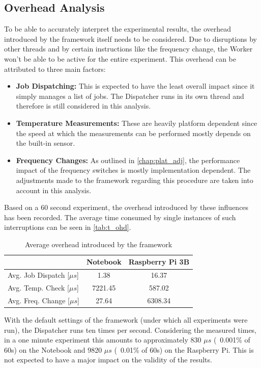 \subsection{Overhead Analysis}\label{chap:ohd_a}
To be able to accurately interpret the experimental results, the overhead introduced by the framework itself needs to be considered. Due to disruptions by other threads and by certain instructions like the frequency change, the Worker won't be able to be active for the entire experiment. This overhead can be attributed to three main factors:
\begin{itemize}
\item \textbf{Job Dispatching:} This is expected to have the least overall impact since it simply manages a list of jobs. The Dispatcher runs in its own thread and therefore is still considered in this analysis.
\item \textbf{Temperature Measurements:} These are heavily platform dependent since the speed at which the measurements can be performed mostly depends on the built-in sensor.
\item \textbf{Frequency Changes:} As outlined in \autoref{chap:plat_adj}, the performance impact of the frequency switches is mostly implementation dependent. The adjustments made to the framework regarding this procedure are taken into account in this analysis.
\end{itemize}
Based on a 60 second experiment, the overhead introduced by these influences has been recorded. The average time consumed by single instances of such interruptions can be seen in \autoref{tab:t_ohd}.\\
\begin{table}[H]
 \centering
 \caption[Overhead]{Average overhead introduced by the framework}\label{tab:t_ohd}
 \begin{tabular}{||l | c | c||} 
 \hline
  & Notebook & Raspberry Pi 3B \\ [0.5ex] 
 \hline\hline
 Avg. Job Dispatch [$\mu s$] & 1.38 & 16.37 \\
 \hline
 Avg. Temp. Check [$\mu s$] & 7221.45 & 587.02 \\
 \hline
 Avg. Freq. Change [$\mu s$] & 27.64 & 6308.34 \\
 \hline
\end{tabular}
\end{table}
With the default settings of the framework (under which all experiments were run), the Dispatcher runs ten times per second. Considering the measured times, in a one minute experiment this amounts to approximately 830 $\mu s$ (~0.001\% of 60s) on the Notebook and 9820 $\mu s$ (~0.01\% of 60s) on the Raspberry Pi. This is not expected to have a major impact on the validity of the results.\\
